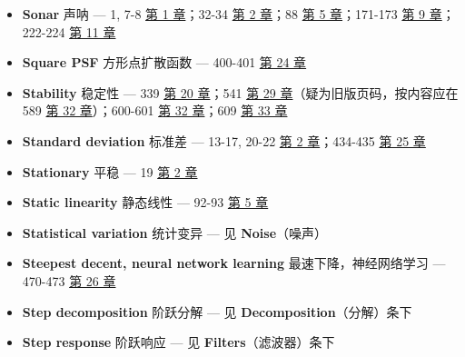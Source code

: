 \begin{itemize}
  \begin{itemize}
  \tightlist
  \item
    digital recording：数字录音 --- 6  \hyperref[ch-01]{第 1
    章}
  \item
    generation：语音生成 --- 6  \hyperref[ch-01]{第 1
    章}；357, 364-368  \hyperref[ch-22]{第 22 章}
  \item
    recognition：语音识别 --- 6-7  \hyperref[ch-01]{第 1
    章}；364-368  \hyperref[ch-22]{第 22 章}
  \item
    speak \& spell：Speak \& Spell 拼读学习机 --- 6 
    \hyperref[ch-01]{第 1 章}
  \item
    vocal tract simulation：声道模拟 --- 6 
    \hyperref[ch-01]{第 1 章}
  \end{itemize}
\item
  \textbf{Sonar} 声呐 --- 1, 7-8  \hyperref[ch-01]{第 1
  章}；32-34  \hyperref[ch-02]{第 2 章}；88 
  \hyperref[ch-05]{第 5 章}；171-173  \hyperref[ch-09]{第 9
  章}；222-224  \hyperref[ch-11]{第 11 章}
\item
  \textbf{Square PSF} 方形点扩散函数 --- 400-401 
  \hyperref[ch-24]{第 24 章}
\item
  \textbf{Stability} 稳定性 --- 339  \hyperref[ch-20]{第 20
  章}；541  \hyperref[ch-29]{第 29
  章}（疑为旧版页码，按内容应在 589  \hyperref[ch-32]{第 32
  章}）；600-601  \hyperref[ch-32]{第 32 章}；609 
  \hyperref[ch-33]{第 33 章}
\item
  \textbf{Standard deviation} 标准差 --- 13-17, 20-22 
  \hyperref[ch-02]{第 2 章}；434-435  \hyperref[ch-25]{第 25
  章}
\item
  \textbf{Stationary} 平稳 --- 19  \hyperref[ch-02]{第 2 章}
\item
  \textbf{Static linearity} 静态线性 --- 92-93 
  \hyperref[ch-05]{第 5 章}
\item
  \textbf{Statistical variation} 统计变异 --- 见 \textbf{Noise}（噪声）
\item
  \textbf{Steepest decent, neural network learning}
  最速下降，神经网络学习 --- 470-473  \hyperref[ch-26]{第 26
  章}
\item
  \textbf{Step decomposition} 阶跃分解 --- 见
  \textbf{Decomposition}（分解）条下
\item
  \textbf{Step response} 阶跃响应 --- 见 \textbf{Filters}（滤波器）条下

\end{itemize}
